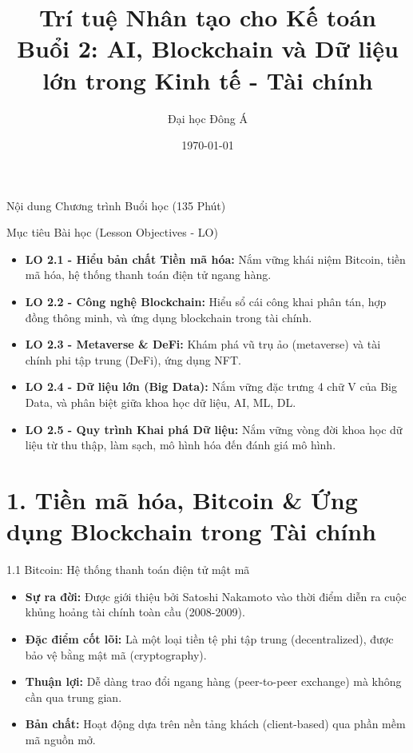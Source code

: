 \documentclass[aspectratio=169]{beamer}
\title[Buổi 2: AI, Blockchain \& Big Data]{Trí tuệ Nhân tạo cho Kế toán \\ \vspace{0.3cm} \Large Buổi 2: AI, Blockchain và Dữ liệu lớn trong Kinh tế - Tài chính}
\author{Đại học Đông Á}
\date{\today}
\begin{document}
\begin{frame}
    \titlepage
\end{frame}

\begin{frame}{Nội dung Chương trình Buổi học (135 Phút)}
    \tableofcontents
\end{frame}

\begin{frame}{Mục tiêu Bài học (Lesson Objectives - LO)}
    \begin{itemize}
        \item \textbf{LO 2.1 - Hiểu bản chất Tiền mã hóa:} Nắm vững khái niệm Bitcoin, tiền mã hóa, hệ thống thanh toán điện tử ngang hàng.
        \item \textbf{LO 2.2 - Công nghệ Blockchain:} Hiểu sổ cái công khai phân tán, hợp đồng thông minh, và ứng dụng blockchain trong tài chính.
        \item \textbf{LO 2.3 - Metaverse \& DeFi:} Khám phá vũ trụ ảo (metaverse) và tài chính phi tập trung (DeFi), ứng dụng NFT.
        \item \textbf{LO 2.4 - Dữ liệu lớn (Big Data):} Nắm vững đặc trưng 4 chữ V của Big Data, và phân biệt giữa khoa học dữ liệu, AI, ML, DL.
        \item \textbf{LO 2.5 - Quy trình Khai phá Dữ liệu:} Nắm vững vòng đời khoa học dữ liệu từ thu thập, làm sạch, mô hình hóa đến đánh giá mô hình.
    \end{itemize}
\end{frame}

\section{1. Tiền mã hóa, Bitcoin \& Ứng dụng Blockchain trong Tài chính}

\begin{frame}{1.1 Bitcoin: Hệ thống thanh toán điện tử mật mã}
    \begin{itemize}
        \item \textbf{Sự ra đời:} Được giới thiệu bởi Satoshi Nakamoto vào thời điểm diễn ra cuộc khủng hoảng tài chính toàn cầu (2008-2009).
        \item \textbf{Đặc điểm cốt lõi:} Là một loại tiền tệ phi tập trung (decentralized), được bảo vệ bằng mật mã (cryptography).
        \item \textbf{Thuận lợi:} Dễ dàng trao đổi ngang hàng (peer-to-peer exchange) mà không cần qua trung gian.
        \item \textbf{Bản chất:} Hoạt động dựa trên nền tảng khách (client-based) qua phần mềm mã nguồn mở.
    \end{itemize}
\end{frame}
\end{document}
